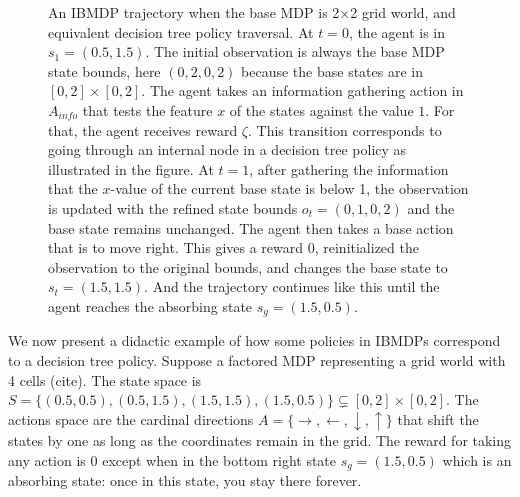 \begin{figure}[h]
\caption{An IBMDP trajectory when the base MDP is 2$\times$2 grid world, and equivalent decision tree policy traversal. At $t=0$, the agent is in $s_1 = (0.5, 1.5)$. The initial observation is always the base MDP state bounds, here $(0, 2, 0, 2)$ because the base states are in $[0, 2] \times [0, 2]$. The agent takes an information gathering action in $A_{info}$ that tests the feature $x$ of the states against the value $1$. For that, the agent receives reward $\zeta$. This transition corresponds to going through an internal node in a decision tree policy as illustrated in the figure. At $t=1$, after gathering the information that the $x$-value of the current base state is below 1, the observation is updated with the refined state bounds $o_t=(0, 1, 0, 2)$ and the base state remains unchanged. The agent then takes a base action that is to move right. This gives a reward 0, reinitialized the observation to the original bounds, and changes the base state to $s_t=(1.5, 1.5)$. And the trajectory continues like this until the agent reaches the absorbing state $s_g=(1.5, 0.5)$.}
\label{fig:poibmdp_trajectory}
\end{figure}

We now present a didactic example of how some policies in IBMDPs correspond to a decision tree policy. 
Suppose a factored MDP representing a grid world with 4 cells (cite). The state space is $S = \{(0.5, 0.5), (0.5, 1.5), (1.5, 1.5), (1.5, 0.5)\}\subsetneq [0, 2] \times [0, 2]$.
The actions space are the cardinal directions $A = \{\rightarrow, \leftarrow, \downarrow, \uparrow\}$ that shift the states by one as long as the coordinates remain in the grid.
The reward for taking any action is 0 except when in the bottom right state $s_g = (1.5, 0.5)$ which is an absorbing state: once in this state, you stay there forever. 

